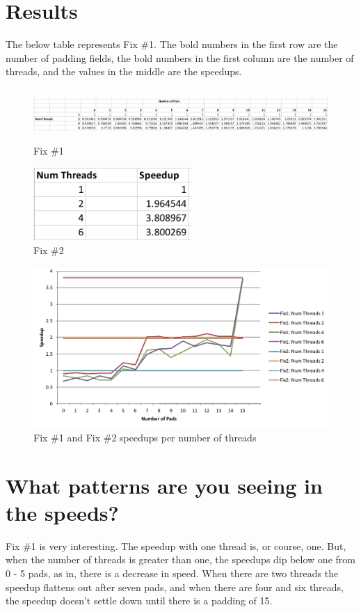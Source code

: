 \documentclass[onecolumn,draftclsnofoot, 10pt, compsoc]{IEEEtran}
\begin{document}
	
	\section{Results}
	The below table represents Fix \#1. The bold numbers in the first row are the number of padding fields, the bold numbers in the first column are the number of threads, and the values in the middle are the speedups.
	
	\begin{figure}[H]
		\includegraphics[width=18cm, height=2cm]{paddingTable}
		\centering
		\caption{Fix \#1}
	\end{figure}

	\begin{figure}[H]
		\includegraphics[width=6cm]{fix2}
		\centering
		\caption{Fix \#2}
	\end{figure}

	\begin{figure}[H]
		\includegraphics[width=18cm]{Graph}
		\centering
		\caption{Fix \#1 and Fix \#2 speedups per number of threads}
	\end{figure}


\clearpage

\section{What patterns are you seeing in the speeds?}
	Fix \#1 is very interesting. The speedup with one thread is, or course, one. But, when the number of threads is greater than one, the speedups dip below one from 0 - 5 pads, as in, there is a decrease in speed. When there are two threads the speedup flattens out after seven pads, and when there are four and six threads, the speedup doesn't settle down until there is a padding of 15. 
	
\end{document}
